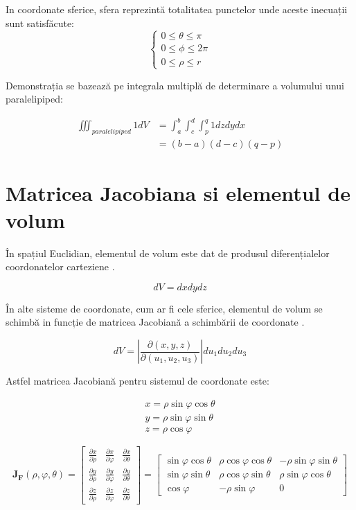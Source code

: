 \documentclass[12pt]{caltech_thesis}
\begin{document}
In coordonate sferice, sfera reprezintă totalitatea punctelor unde aceste inecuații sunt satisfăcute:
$$
\begin{cases}
0 \leq \theta \leq \pi \\
0 \leq \phi \leq 2\pi \\
0 \leq \rho \leq r
\end{cases}
$$

Demonstrația se bazează pe integrala multiplă de determinare a volumului unui paralelipiped:

$$
\begin{aligned}
\iiint_{paralelipiped} 1 d V
&=\int_{a}^{b} \int_{c}^{d} \int_{p}^{q} 1 d z d y d x \\
&=(b-a)(d-c)(q-p)
\end{aligned}
$$


\section{Matricea Jacobiana si elementul de volum}

În spațiul Euclidian, elementul de volum este dat de produsul diferențialelor coordonatelor carteziene \cite{volume-element}.

$$
d V=d x d y d z
$$

În alte sisteme de coordonate, cum ar fi cele sferice, elementul de volum se schimbă in funcție de matricea Jacobiană a schimbării de coordonate \cite{jacobian-matrix}.

$$
d V=\left|\frac{\partial(x, y, z)}{\partial\left(u_{1}, u_{2}, u_{3}\right)}\right| d u_{1} d u_{2} d u_{3}
$$

Astfel matricea Jacobiană pentru sistemul de coordonate este:

$$
\begin{array}{l}
x=\rho \sin \varphi \cos \theta \\
y=\rho \sin \varphi \sin \theta \\
z=\rho \cos \varphi
\end{array}
$$

$$
\mathbf{J}_{\mathbf{F}}(\rho, \varphi, \theta)=\left[\begin{array}{lll}
\frac{\partial x}{\partial \rho} & \frac{\partial x}{\partial \varphi} & \frac{\partial x}{\partial \theta} \\
\frac{\partial y}{\partial \rho} & \frac{\partial y}{\partial \varphi} & \frac{\partial y}{\partial \theta} \\
\frac{\partial z}{\partial \rho} & \frac{\partial z}{\partial \varphi} & \frac{\partial z}{\partial \theta}
\end{array}\right]=\left[\begin{array}{ccc}
\sin \varphi \cos \theta & \rho \cos \varphi \cos \theta & -\rho \sin \varphi \sin \theta \\
\sin \varphi \sin \theta & \rho \cos \varphi \sin \theta & \rho \sin \varphi \cos \theta \\
\cos \varphi & -\rho \sin \varphi & 0
\end{array}\right]
$$
\end{document}
